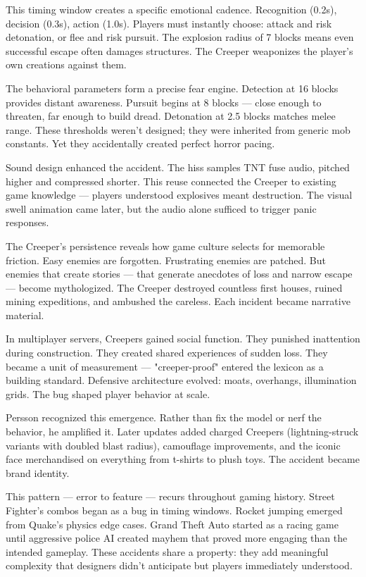 This timing window creates a specific emotional cadence. Recognition (0.2s), decision (0.3s), action (1.0s). Players must instantly choose: attack and risk detonation, or flee and risk pursuit. The explosion radius of 7 blocks means even successful escape often damages structures. The Creeper weaponizes the player's own creations against them.

The behavioral parameters form a precise fear engine. Detection at 16 blocks provides distant awareness. Pursuit begins at 8 blocks — close enough to threaten, far enough to build dread. Detonation at 2.5 blocks matches melee range. These thresholds weren't designed; they were inherited from generic mob constants. Yet they accidentally created perfect horror pacing.

Sound design enhanced the accident. The hiss samples TNT fuse audio, pitched higher and compressed shorter. This reuse connected the Creeper to existing game knowledge — players understood explosives meant destruction. The visual swell animation came later, but the audio alone sufficed to trigger panic responses.

The Creeper's persistence reveals how game culture selects for memorable friction. Easy enemies are forgotten. Frustrating enemies are patched. But enemies that create stories — that generate anecdotes of loss and narrow escape — become mythologized. The Creeper destroyed countless first houses, ruined mining expeditions, and ambushed the careless. Each incident became narrative material.

In multiplayer servers, Creepers gained social function. They punished inattention during construction. They created shared experiences of sudden loss. They became a unit of measurement — "creeper-proof" entered the lexicon as a building standard. Defensive architecture evolved: moats, overhangs, illumination grids. The bug shaped player behavior at scale.

Persson recognized this emergence. Rather than fix the model or nerf the behavior, he amplified it. Later updates added charged Creepers (lightning-struck variants with doubled blast radius), camouflage improvements, and the iconic face merchandised on everything from t-shirts to plush toys. The accident became brand identity.

This pattern — error to feature — recurs throughout gaming history. Street Fighter's combos began as a bug in timing windows. Rocket jumping emerged from Quake's physics edge cases. Grand Theft Auto started as a racing game until aggressive police AI created mayhem that proved more engaging than the intended gameplay. These accidents share a property: they add meaningful complexity that designers didn't anticipate but players immediately understood.

